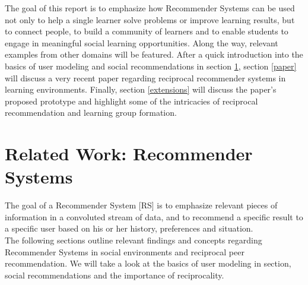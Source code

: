 \documentclass[conference]{IEEEtran}
\begin{document}
The goal of this report is to emphasize how Recommender Systems can be used not only to help a single learner solve problems or improve learning results, but to connect people, to build a community of learners and to enable students to engage in meaningful social learning opportunities. Along the way, relevant examples from other domains will be featured. After a quick introduction into the basics of user modeling and social recommendations in section \ref{relatedwork}, section \ref{paper} will discuss a very recent paper regarding reciprocal recommender systems in learning environments. Finally, section \ref{extensions} will discuss the paper's proposed prototype and highlight some of the intricacies of reciprocal recommendation and learning group formation.\\

\section{Related Work: Recommender Systems} \label{relatedwork}

The goal of a Recommender System [RS] is to emphasize relevant pieces of information in a convoluted stream of data, and to recommend a specific result to a specific user based on his or her history, preferences and situation. \cite{ricci2011introduction}\\
The following sections outline relevant findings and concepts regarding Recommender Systems in social environments and reciprocal peer recommendation. We will take a look at the basics of user modeling in section, social recommendations and the importance of reciprocality.
\end{document}
